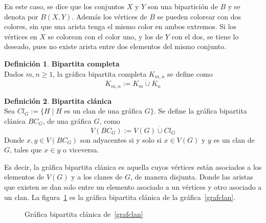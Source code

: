 \documentclass[11pt]{book}
\theoremstyle{definition}
\newtheorem{definition}{Definición}
\begin{document}
En este caso, se dice que los conjuntos $X$ y $Y$ son una
bipartición de $B$ y se denota por $B(X,Y)$. Además
los vértices de $B$ se pueden colorear con dos colores, sin que una
arista tenga el mismo color en ambos extremos. Si los vértices en $X$
se colorean con el color uno, y los de $Y$ con el dos, se tiene lo
deseado, pues no existe arista entre dos elementos del mismo conjunto.



\begin{definition}\textbf{Bipartita completa}\\
  Dados $m,n\geq 1$, la gráfica bipartita completa $K_{m,n}$ se define
  como $$K_{m,n}:=\overline{K_m \cup K_n}$$
\end{definition}


\begin{definition}\textbf{Bipartita clánica}\\
  Sea $Cl_G:=\{H \mid H$ es un clan de una gráfica $G \}$. Se define
  la gráfica bipartita clánica $BC_G$, de una gráfica $G$,
  como $$V(BC_G) := V(G) \dot{\cup} Cl_G$$ Donde $x,y\in V(BC_G)$ son
  adyacentes si y solo si $x\in V(G)$ y $y$ es un clan de $G$, tales
  que $x\in y$ o viceversa.
\end{definition}

Es decir, la gráfica bipartita clánica es aquella cuyos
vértices están asociados a los elementos de $V(G)$ y a los clanes de
$G$, de manera disjunta. Donde las aristas que existen se dan solo
entre un elemento asociado a un vértices y otro asociado a un clan. La
figura~\ref{BCG} es la gráfica bipartita clánica de la
gráfica~\ref{grafclan}.

\begin{figure}
  \centering
  \caption{Gráfica bipartita clánica de~\ref{grafclan}}\label{BCG}
\end{figure}
\end{document}
